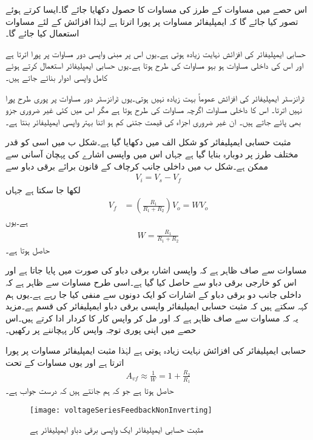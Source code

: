 اس حصے میں مساوات  کے طرز کی مساوات کا حصول دکھایا جائے گا۔ایسا کرتے ہوئے تصور کیا جائے گا کہ ایمپلیفائر مساوات  پر پورا اترتا ہے لہٰذا افزائش کے لئے مساوات  استعمال کیا جائے گا۔

حسابی ایمپلیفائر کی افزائش نہایت زیادہ ہوتی ہے۔یوں اس پر مبنی واپسی دور مساوات  پر پورا اترتا ہے اور اس کی داخلی مساوات ہو بہو مساوات  کی طرح ہوتا ہے۔یوں حسابی ایمپلیفائر استعمال کرتے ہوئے کامل واپسی ادوار بنائے جاتے ہیں۔

ٹرانزسٹر ایمپلیفائر کی افزائش عموماً بہت زیادہ نہیں ہوتی۔یوں ٹرانزسٹر دور مساوات  پر پوری طرح پورا نہیں اترتا۔ اس کا داخلی مساوات اگرچہ مساوات  کی طرح ہوتا ہے مگر اس میں کئی غیر ضروری جزو بھی پائے جاتے ہیں۔ ان غیر ضروری اجزاء    کی قیمت جتنی کم ہو اتنا بہتر واپسی ایمپلیفائر بنتا ہے۔


مثبت حسابی ایمپلیفائر کو شکل  الف میں دکھایا گیا ہے۔شکل  ب میں اسی کو قدر مختلف طرز پر دوبارہ بنایا گیا ہے جہاں اس میں واپسی اشارے کی پہچان آسانی سے ممکن ہے۔شکل  ب میں داخلی جانب کرچاف کے قانون برائے برقی دباو سے
\begin{align} \label{مساوات_واپسی_واپسی_برقی_دباو_ایمپلیفائر_کی_جماعت_بندی}
V_i=V_s-V_f
\end{align}
لکھا جا سکتا ہے جہاں
\begin{align} \label{مساوات_واپسی_مثبت_واپس_کار}
V_f &=\left( \frac{R_1}{R_1+R_2} \right) V_o =W V_o
\end{align}
ہے۔یوں
\begin{align}
W =\frac{R_1}{R_1+R_2}
\end{align}
حاصل ہوتا ہے۔

مساوات  سے صاف ظاہر ہے کہ واپسی اشارہ برقی دباو کی صورت میں پایا جاتا ہے اور اس کو خارجی برقی دباو سے حاصل کیا گیا ہے۔اسی طرح مساوات  سے ظاہر ہے کہ داخلی جانب دو برقی دباو کے اشارات کو ایک دونوں سے منفی کیا جا رہے ہے۔یوں  ہم کہہ سکتے ہیں کہ مثبت حسابی ایمپلیفائر واپسی برقی دباو ایمپلیفائر کی قسم ہے۔مزید یہ کہ مساوات  سے صاف ظاہر ہے کہ  اور  مل کر واپس کار کا کردار ادا کرتے ہیں۔اس حصے میں اپنی پوری توجہ واپس کار پہچاننے پر رکھیں۔

حسابی ایمپلیفائر کی افزائش  نہایت زیادہ ہوتی ہے لہٰذا مثبت ایمپلیفائر مساوات   پر پورا اترتا ہے اور یوں مساوات  کے تحت
\begin{align}
A_{vf} \approx \frac{1}{W}=1+\frac{R_2}{R_1}
\end{align}
حاصل ہوتا ہے جو کہ ہم جانتے ہیں کہ درست جواب ہے۔
\begin{figure}
\centering
\texttt{[image: voltageSeriesFeedbackNonInverting]}
\caption{مثبت حسابی ایمپلیفائر ایک واپسی برقی دباو ایمپلیفائر ہے}
\label{شکل_واپسی_مثبت_واپسی_ایمپلیفائر}
\end{figure}

